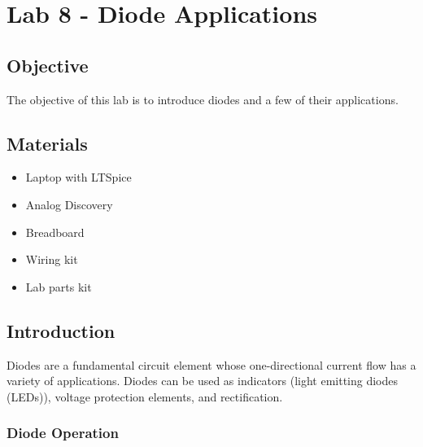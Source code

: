\chapter{Lab 8 - Diode Applications}

\section{Objective}

The objective of this lab is to introduce diodes and a few of their applications. 

\section{Materials}

\begin{itemize}
	\item Laptop with LTSpice
	\item Analog Discovery
	\item Breadboard
	\item Wiring kit
	\item Lab parts kit
\end{itemize}

\section{Introduction}

Diodes are a fundamental circuit element whose one-directional current flow has a variety of applications. Diodes can be used as indicators (light emitting diodes (LEDs)), voltage protection elements, and rectification.


\subsection{Diode Operation}

